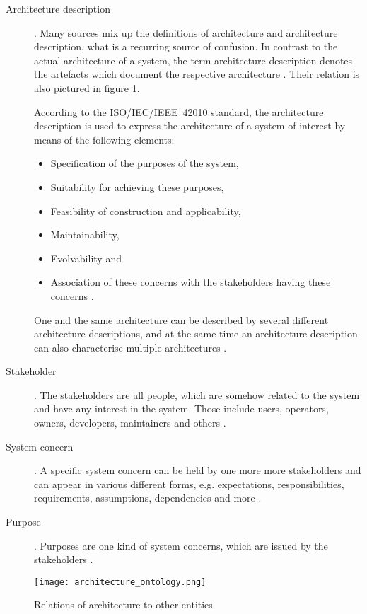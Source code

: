\begin{description}
\item [Architecture description].
	Many sources mix up the definitions of architecture and architecture description, what is a recurring source of confusion. In contrast to the actual architecture of a system, the term architecture description denotes the artefacts which document the respective architecture \cite{ISO_42010}. Their relation is also pictured in figure \ref{fig:architecture_ontology}.

	According to the \mbox{ISO/IEC/IEEE 42010} standard, the architecture description is used to express the architecture of a system of interest by means of the following elements:
	\begin{itemize}
	\item Specification of the purposes of the system,
	\item Suitability for achieving these purposes,
	\item Feasibility of construction and applicability,
	\item Maintainability,
	\item Evolvability and
	\item Association of these concerns with the stakeholders having these concerns \cite{ISO_42010}.
	\end{itemize}
	One and the same architecture can be described by several different architecture descriptions, and at the same time an architecture description can also characterise multiple architectures \cite{ISO_42010}.

\item [Stakeholder].
	The stakeholders are all people, which are somehow related to the system and have any interest in the system. Those include users, operators, owners, developers, maintainers and others \cite{ISO_42010}.

\item [System concern].
	A specific system concern can be held by one more more stakeholders and can appear in various different forms, e.g. expectations, responsibilities, requirements, assumptions, dependencies and more \cite{ISO_42010}. 

\item [Purpose].
	Purposes are one kind of system concerns, which are issued by the stakeholders \cite{ISO_42010}.
\end{description}

\begin{figure}[!htbp]
\centering
\texttt{[image: architecture\_ontology.png]}
\caption{Relations of architecture to other entities \cite{ISO_42010}}
\label{fig:architecture_ontology}
\end{figure}










